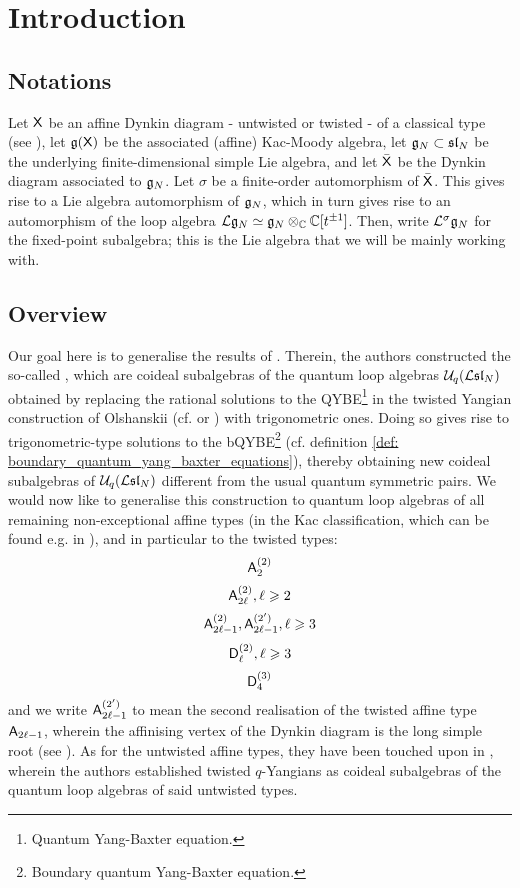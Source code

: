 \section{Introduction}
    \subsection{Notations}
        Let $\mathsf{X}$ be an affine Dynkin diagram - untwisted or twisted - of a classical type (see \cite[Chapter 4, Tables Aff 2 and 3, p. 55]{kac_infinite_dimensional_lie_algebras}), let $\mathfrak{g}(\mathsf{X})$ be the associated (affine) Kac-Moody algebra, let $\mathfrak{g}_N \subset \mathfrak{sl}_N$ be the underlying finite-dimensional simple Lie algebra, and let $\bar{\mathsf{X}}$ be the Dynkin diagram associated to $\mathfrak{g}_N$. Let $\sigma$ be a finite-order automorphism of $\bar{\mathsf{X}}$. This gives rise to a Lie algebra automorphism of $\mathfrak{g}_N$, which in turn gives rise to an automorphism of the loop algebra $\Loop\g_N \cong \g_N \tensor_{\bbC} \bbC[t^{\pm 1}]$. Then, write $\mathcal{L}^{\sigma}\mathfrak{g}_N$ for the fixed-point subalgebra; this is the Lie algebra that we will be mainly working with. 

    \subsection{Overview}
        Our goal here is to generalise the results of \cite{molev_ragoucy_sorba_twisted_q_yangians_type_A}. Therein, the authors constructed the so-called , which are coideal subalgebras of the quantum loop algebras $\mathcal{U}_q(\mathcal{L}\mathfrak{sl}_N)$ obtained by replacing the rational solutions to the QYBE\footnote{Quantum Yang-Baxter equation.} in the twisted Yangian construction of Olshanskii (cf. \cite{olshanski_twisted_yangians_and_infinite_dimensional_classical_lie_algebras} or \cite[Chapter 2]{molev_yangians_and_classical_lie_algebras}) with trigonometric ones. Doing so gives rise to trigonometric-type solutions to the bQYBE\footnote{Boundary quantum Yang-Baxter equation.} (cf. definition \ref{def: boundary_quantum_yang_baxter_equations}), thereby obtaining new coideal subalgebras of $\mathcal{U}_q(\mathcal{L}\mathfrak{sl}_N)$ different from the usual quantum symmetric pairs. We would now like to generalise this construction to quantum loop algebras of all remaining non-exceptional affine types (in the Kac classification, which can be found e.g. in \cite[Chapter 4]{kac_infinite_dimensional_lie_algebras}), and in particular to the twisted types:
            $$\mathsf{A}_2^{(2)}$$
            $$\mathsf{A}_{2\ell}^{(2)}, \ell \geqslant 2$$
            $$\mathsf{A}_{2\ell - 1}^{(2)}, \mathsf{A}_{2\ell - 1}^{(2')}, \ell \geqslant 3$$
            $$\mathsf{D}_{\ell}^{(2)}, \ell \geqslant 3$$
            $$\mathsf{D}_4^{(3)}$$
        and we write $\mathsf{A}_{2\ell - 1}^{(2')}$ to mean the second realisation of the twisted affine type $\mathsf{A}_{2\ell - 1}$, wherein the affinising vertex of the Dynkin diagram is the long simple root (see \cite[Chapter 4, Tables Aff 2 and 3, p. 55]{kac_infinite_dimensional_lie_algebras}). As for the untwisted affine types, they have been touched upon in \cite{regelskis_vlaar_reflection_matrices_coideal_subalgebras}, wherein the authors established twisted $q$-Yangians as coideal subalgebras of the quantum loop algebras of said untwisted types.  
        
